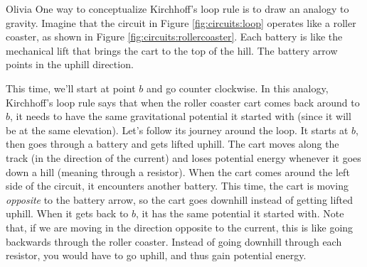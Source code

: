 \begin{studentOpinion}{Olivia}
One way to conceptualize Kirchhoff's loop rule is to draw an analogy to gravity. Imagine that the circuit in Figure \ref{fig:circuits:loop} operates like a roller coaster, as shown in Figure \ref{fig:circuits:rollercoaster}. Each battery is like the mechanical lift that brings the cart to the top of the hill. The battery arrow points in the uphill direction. 

This time, we'll start at point $b$ and go counter clockwise. In this analogy, Kirchhoff's loop rule says that when the roller coaster cart comes back around to $b$, it needs to have the same gravitational potential it started with (since it will be at the same elevation). Let's follow its journey around the loop. It starts at $b$, then goes through a battery and gets lifted uphill. The cart moves along the track (in the direction of the current) and loses potential energy whenever it goes down a hill (meaning through a resistor). When the cart comes around the left side of the circuit, it encounters another battery. This time, the cart is moving \textit{opposite} to the battery arrow, so the cart goes downhill instead of getting lifted uphill. When it gets back to $b$, it has the same potential it started with. Note that, if we are moving in the direction opposite to the current, this is like going backwards through the roller coaster. Instead of going downhill through each resistor, you would have to go uphill, and thus gain potential energy.
\end{studentOpinion}

